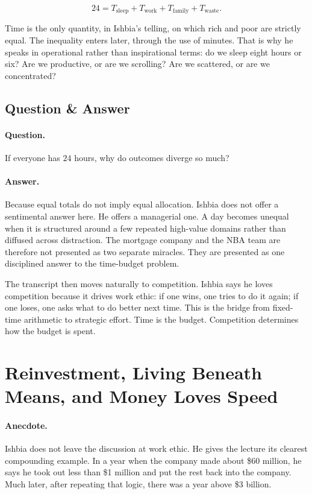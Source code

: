 \begin{equation}
24 = T_{\text{sleep}} + T_{\text{work}} + T_{\text{family}} + T_{\text{waste}}.
\end{equation}

Time is the only quantity, in Ishbia's telling, on which rich and poor are strictly equal. The inequality enters later, through the use of minutes. That is why he speaks in operational rather than inspirational terms: do we sleep eight hours or six? Are we productive, or are we scrolling? Are we scattered, or are we concentrated?

\subsection{Question \& Answer}

\paragraph{Question.} If everyone has \(24\) hours, why do outcomes diverge so much?

\paragraph{Answer.} Because equal totals do not imply equal allocation. Ishbia does not offer a sentimental answer here. He offers a managerial one. A day becomes unequal when it is structured around a few repeated high-value domains rather than diffused across distraction. The mortgage company and the NBA team are therefore not presented as two separate miracles. They are presented as one disciplined answer to the time-budget problem.

The transcript then moves naturally to competition. Ishbia says he loves competition because it drives work ethic: if one wins, one tries to do it again; if one loses, one asks what to do better next time. This is the bridge from fixed-time arithmetic to strategic effort. Time is the budget. Competition determines how the budget is spent.

\section{Reinvestment, Living Beneath Means, and Money Loves Speed}

\paragraph{Anecdote.} Ishbia does not leave the discussion at work ethic. He gives the lecture its clearest compounding example. In a year when the company made about \$60 million, he says he took out less than \$1 million and put the rest back into the company. Much later, after repeating that logic, there was a year above \$3 billion.

